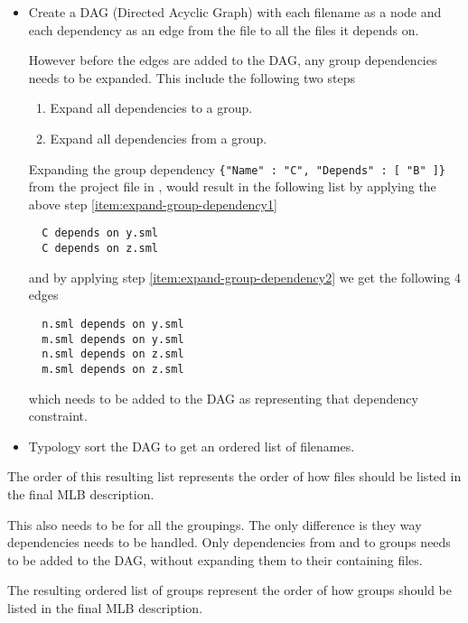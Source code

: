 \begin{itemize}
\item Create a DAG (Directed Acyclic Graph) with each filename as a node and
  each dependency as an edge from the file to all the files it depends on.
  
  However before the edges are added to the DAG, any group dependencies needs to
  be expanded. This include the following two steps
  
  \begin{enumerate}
  \item \label{item:expand-group-dependency1} Expand all dependencies to a
    group.
  \item \label{item:expand-group-dependency2} Expand all dependencies from a
    group.
  \end{enumerate}
  
  Expanding the group dependency \texttt{\{"Name" : "C", "Depends" : [ "B" ]\}}
  from the project file in ,
  would result in the following list by applying the above step
  \ref{item:expand-group-dependency1}
  
\begin{lstlisting}
  C depends on y.sml
  C depends on z.sml
\end{lstlisting}
  
  and by applying step \ref{item:expand-group-dependency2} we get the following
  4 edges
  
\begin{lstlisting}
  n.sml depends on y.sml
  m.sml depends on y.sml
  n.sml depends on z.sml
  m.sml depends on z.sml
\end{lstlisting}
  
  which needs to be added to the DAG as representing that dependency constraint.
  
\item Typology sort the DAG to get an ordered list of filenames.
\end{itemize}

The order of this resulting list represents the order of how files should be
listed in the final MLB description. 


This also needs to be for all the groupings. The only difference is they way
dependencies needs to be handled. Only dependencies from and to groups needs to
be added to the DAG, without expanding them to their containing files.

The resulting ordered list of groups represent the order of how groups should be
listed in the final MLB description.


